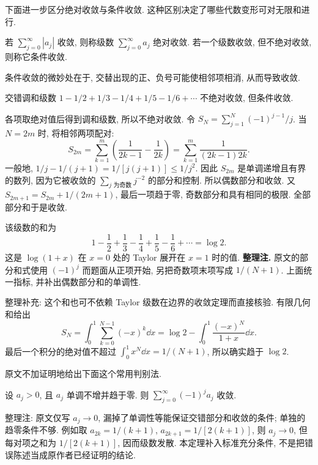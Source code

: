 下面进一步区分绝对收敛与条件收敛. 这种区别决定了哪些代数变形可对无限和进行.

\begin{definition}\label{def:absolute-convergence}
若 $\sum_{j=0}^{\infty}|a_j|$ 收敛, 则称级数 $\sum_{j=0}^{\infty}a_j$ 绝对收敛. 若一个级数收敛, 但不绝对收敛, 则称它条件收敛.
\end{definition}

条件收敛的微妙处在于, 交替出现的正、负号可能使相邻项相消, 从而导致收敛.

\begin{example}\label{ex:alternating-harmonic}
交错调和级数 $1-1/2+1/3-1/4+1/5-1/6+\cdots$ 不绝对收敛, 但条件收敛.
\end{example}
\begin{solution}
各项取绝对值后得到调和级数, 所以不绝对收敛. 令 $S_N=\sum_{j=1}^{N}(-1)^{j-1}/j$. 当 $N=2m$ 时, 将相邻两项配对:
\[
S_{2m}=\sum_{k=1}^{m}\left(\frac{1}{2k-1}-\frac{1}{2k}\right)
=\sum_{k=1}^{m}\frac{1}{(2k-1)2k}.
\]
一般地, $1/j-1/(j+1)=1/[j(j+1)]\leq1/j^2$. 因此 $S_{2m}$ 是单调递增且有界的数列, 因为它被收敛的 $\sum_{j\text{ 为奇数}}j^{-2}$ 的部分和控制. 所以偶数部分和收敛. 又 $S_{2m+1}=S_{2m}+1/(2m+1)$, 最后一项趋于零, 奇数部分和具有相同的极限. 全部部分和于是收敛.

该级数的和为
\[
1-\frac12+\frac13-\frac14+\frac15-\frac16+\cdots=\log2.
\]
这是 $\log(1+x)$ 在 $x=0$ 处的 Taylor 展开在 $x=1$ 时的值. \textbf{整理注.} 原文的部分和式使用 $(-1)^j$ 而题面从正项开始, 另把奇数项末项写成 $1/(N+1)$. 上面统一指标, 并补出偶数部分和的单调性.

整理补充: 这个和也可不依赖 Taylor 级数在边界的收敛定理而直接核验. 有限几何和给出
\[
S_N=\int_0^1\sum_{k=0}^{N-1}(-x)^k\dd x
=\log2-\int_0^1\frac{(-x)^N}{1+x}\dd x.
\]
最后一个积分的绝对值不超过 $\int_0^1x^N\dd x=1/(N+1)$, 所以确实趋于 $\log2$.
\end{solution}

原文不加证明地给出下面这个常用判别法.

\begin{theorem}[交错级数判别法]\label{thm:alternating-test}
设 $a_j>0$, 且 $a_j$ 单调不增并趋于零. 则 $\sum_{j=0}^{\infty}(-1)^j a_j$ 收敛.
\end{theorem}
\begin{remark}
整理注: 原文仅写 $a_j\to0$, 漏掉了单调性等能保证交错部分和收敛的条件; 单独的趋零条件不够. 例如取 $a_{2k}=1/(k+1)$, $a_{2k+1}=1/[2(k+1)]$, 则 $a_j\to0$, 但每对项之和为 $1/[2(k+1)]$, 因而级数发散. 本定理补入标准充分条件, 不是把错误陈述当成原作者已经证明的结论.
\end{remark}

